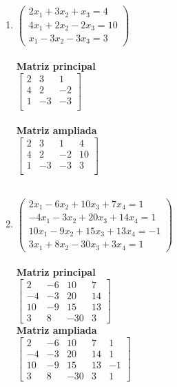 \documentclass[12pt]{article}
\begin{document}
\begin{enumerate}
\begin{multicols}{2}
\begin{enumerate}
		\item $\begin{pmatrix}
				2x_1 + 3x_2 + x_3 = 4 \\
				4x_1 + 2x_2 -2x_3 =10 \\
				 x_1 - 3x_2 -3x_3 = 3
			\end {pmatrix}$
			\\\ \\ \bf Matriz principal \\
			$\begin{bmatrix}
				2 & 3 & 1 \\
				4 & 2 &-2 \\
				1 &-3 &-3 \\
			\end{bmatrix}$
			\\\ \\ \bf Matriz ampliada \\
			$\begin{bmatrix}
				2 & 3 & 1 & 4\\
				4 & 2 &-2 &10\\
				1 &-3 &-3 & 3\\
			\end{bmatrix}$\\\ \\
			
		\item $\begin{pmatrix} 
				 2x_1 - 6x_2 + 10x_3 + 7x_4 = 1 \\
				-4x_1 - 3x_2 + 20x_3 +14x_4 = 1 \\
				10x_1 - 9x_2 + 15x_3 +13x_4 =-1 \\
				 3x_1 + 8x_2 - 30x_3 + 3x_4 = 1
			\end {pmatrix}$
			\\\ \\ \bf Matriz principal \\
			$\begin{bmatrix}
				 2 & -6 & 10 &  7\\
				-4 & -3 & 20 & 14\\
				10 & -9 & 15 & 13\\
				 3 &  8 &-30 &  3
			\end{bmatrix}$
			\\ \bf Matriz ampliada \\
			$\begin{bmatrix}
				 2 & -6 & 10 &  7 & 1\\
				-4 & -3 & 20 & 14 & 1\\
				10 & -9 & 15 & 13 &-1\\
				 3 &  8 &-30 &  3 & 1
			\end{bmatrix}$\\\ \\
			
	\end{enumerate}
\end{multicols}

\end{enumerate}
\end{document}
